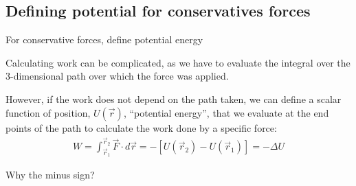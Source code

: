 \documentclass[aspectratio=169,
hyperref={colorlinks,urlcolor=blue}
]{beamer}
\begin{document}
\subsection{Defining potential for conservatives forces}
\label{subsec:definingpotentialforconservatiesforces}
\begin{bulletframe}{For conservative forces, define potential
energy}
\item Calculating work can be complicated, as we have to evaluate the integral over the 3-dimensional path over which the force was applied.
\item However, if the work does not depend on the path taken, we can define a scalar function of position, $U(\vec r)$, ``potential energy'', that we evaluate at the end points of the path to calculate the work done by a specific force:
\begin{align*}
W=\int_{\vec r_1}^{\vec r_2}\vec F\cdot d\vec r =-\left[ U(\vec r_2)-U(\vec r_1) \right] = -\Delta U 
\end{align*}
\item Why the minus sign?
\end{bulletframe}


\end{document}
